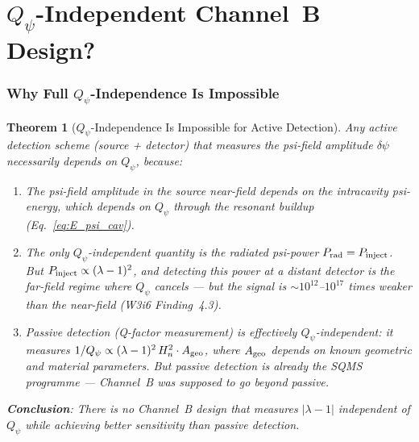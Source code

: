 \documentclass[11pt]{article}
\newcommand{\dpsi}{\delta\psi}
\newcommand{\lam}{\lambda}
\newcommand{\Qpsi}{Q_\psi}
\newcommand{\Heff}{H_n}
\newcommand{\lbone}{|\lam - 1|}
\newtheorem{theorem}{Theorem}[section]
\theoremstyle{definition}
\theoremstyle{remark}
\begin{document}
\part{$\Qpsi$-Independent Channel~B Design?}
\label{part:Qpsi_independent}

\section{Why Full $\Qpsi$-Independence Is Impossible}
\label{sec:impossible}

\begin{theorem}[$\Qpsi$-Independence Is Impossible for Active Detection]
\label{thm:Qpsi_independent}
Any active detection scheme (source + detector) that measures the
psi-field amplitude $\dpsi$ necessarily depends on $\Qpsi$, because:

\begin{enumerate}
\item The psi-field amplitude in the source near-field depends on
  the intracavity psi-energy, which depends on $\Qpsi$ through the
  resonant buildup (Eq.~\eqref{eq:E_psi_cav}).
\item The only $\Qpsi$-independent quantity is the \emph{radiated}
  psi-power $P_{\rm rad} = P_{\rm inject}$. But $P_{\rm inject}
  \propto (\lam-1)^2$, and detecting this power at a distant detector
  is the far-field regime where $\Qpsi$ cancels --- but the signal
  is $\sim 10^{12}$--$10^{17}$ times weaker than the near-field
  (W3i6 Finding~4.3).
\item Passive detection (Q-factor measurement) is effectively
  $\Qpsi$-independent: it measures
  $1/Q_\psi \propto (\lam-1)^2\,\Heff^2\cdot A_{\rm geo}$, where
  $A_{\rm geo}$ depends on known geometric and material parameters.
  But passive detection is already the SQMS programme --- Channel~B
  was supposed to go \emph{beyond} passive.
\end{enumerate}

\textbf{Conclusion}: There is no Channel~B design that measures
$\lbone$ independent of $\Qpsi$ while achieving better sensitivity
than passive detection.
\end{theorem}
\end{document}
